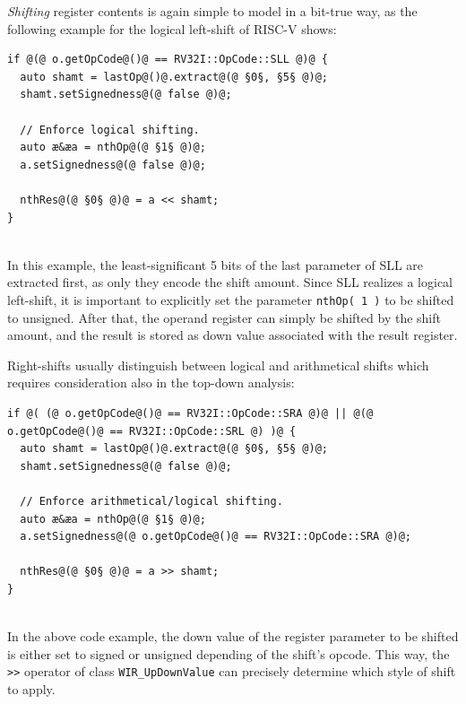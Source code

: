 \begin{enumerate}[resume]
  \emph{Shifting} register contents is again simple to model in a bit-true way, as the following example for the logical left-shift of RISC-V shows: \\
\begin{lstlisting}[style=code,float=!h,xleftmargin=10mm,aboveskip=-0.8 \baselineskip,belowskip=-0.8 \baselineskip]
if @(@ o.getOpCode@()@ == RV32I::OpCode::SLL @)@ {
  auto shamt = lastOp@()@.extract@(@ §0§, §5§ @)@;
  shamt.setSignedness@(@ false @)@;

  // Enforce logical shifting.
  auto æ&æa = nthOp@(@ §1§ @)@;
  a.setSignedness@(@ false @)@;

  nthRes@(@ §0§ @)@ = a << shamt;
}
\end{lstlisting}
  \\
  In this example, the least-significant 5 bits of the last parameter of SLL are extracted first, as only they encode the shift amount.
  Since SLL realizes a logical left-shift, it is important to explicitly set the parameter \texttt{nthOp( 1 )} to be shifted to unsigned.
  After that, the operand register can simply be shifted by the shift amount, and the result is stored as down value associated with the result register.

  Right-shifts usually distinguish between logical and arithmetical shifts which requires consideration also in the top-down analysis: \\
\begin{lstlisting}[style=code,float=!h,xleftmargin=10mm,aboveskip=-0.8 \baselineskip,belowskip=-0.8 \baselineskip]
if @( (@ o.getOpCode@()@ == RV32I::OpCode::SRA @)@ || @(@ o.getOpCode@()@ == RV32I::OpCode::SRL @) )@ {
  auto shamt = lastOp@()@.extract@(@ §0§, §5§ @)@;
  shamt.setSignedness@(@ false @)@;

  // Enforce arithmetical/logical shifting.
  auto æ&æa = nthOp@(@ §1§ @)@;
  a.setSignedness@(@ o.getOpCode@()@ == RV32I::OpCode::SRA @)@;

  nthRes@(@ §0§ @)@ = a >> shamt;
}
\end{lstlisting}
  \\
  In the above code example, the down value of the register parameter to be shifted is either set to signed or unsigned depending of the shift's opcode.
  This way, the \texttt{>{}>} operator of class \texttt{WIR\_UpDownValue} can precisely determine which style of shift to apply.


\end{enumerate}
